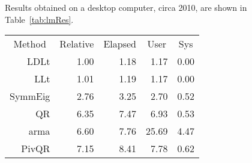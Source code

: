 \documentclass[shortnames,article]{jss}
\begin{document}
Results obtained on a desktop computer, circa 2010, are shown in
Table~\ref{tab:lmRes}.
\begin{table}[tb]
  \centering
  \begin{tabular}{r r r r r}
    \toprule
    \multicolumn{1}{c}{Method} & \multicolumn{1}{c}{Relative} &
    \multicolumn{1}{c}{Elapsed} & \multicolumn{1}{c}{User} &
    \multicolumn{1}{c}{Sys}\\
    \cmidrule(r){2-5}   %
     LDLt &    1.00 &    1.18 &      1.17 &     0.00 \\
      LLt &    1.01 &    1.19 &      1.17 &     0.00 \\
  SymmEig &    2.76 &    3.25 &      2.70 &     0.52 \\
       QR &    6.35 &    7.47 &      6.93 &     0.53 \\
     arma &    6.60 &    7.76 &     25.69 &     4.47 \\
    PivQR &    7.15 &    8.41 &      7.78 &     0.62 \\

\end{tabular}
\end{table}
\end{document}
